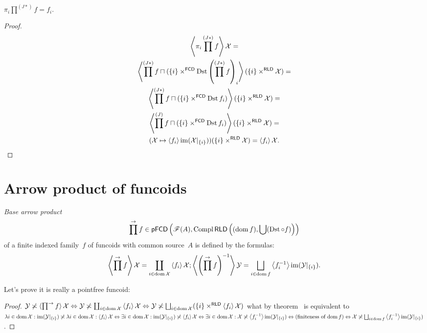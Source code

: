\begin{thm}
$\pi_i\prod^{(J\ast)}f=f_i$.
\end{thm}

\begin{proof}
\begin{multline*}
\left\langle \pi_i\prod^{(J\ast)}f\right\rangle\mathcal{X} =\\
\left\langle \prod^{(J\ast)}f\sqcap(\{i\}\times^{\mathsf{FCD}}\operatorname{Dst} \left(\prod^{(J\ast)}f\right)_i\right\rangle(\{i\}\times^{\mathsf{RLD}}\mathcal{X})=\\
\left\langle \prod^{(J\ast)}f\sqcap(\{i\}\times^{\mathsf{FCD}}\operatorname{Dst} f_i)\right\rangle(\{i\}\times^{\mathsf{RLD}}\mathcal{X})=\\
\left\langle \prod^{(J)}f\sqcap(\{i\}\times^{\mathsf{FCD}}\operatorname{Dst} f_i)\right\rangle(\{i\}\times^{\mathsf{RLD}}\mathcal{X})=\\
(\mathcal{X}\mapsto\left\langle f_i\right\rangle\operatorname{im}(\mathcal{X}|_{\{i\}}))(\{i\}\times^{\mathsf{RLD}}\mathcal{X})=
\left\langle f_i\right\rangle\mathcal{X}.
\end{multline*}
\end{proof}

\section{Arrow product of funcoids}

\begin{defn}
\emph{Base arrow product} \[ \prod^{\rightarrow}f\in\mathsf{pFCD}\left(\mathscr{F}(A),\operatorname{Compl}\mathsf{RLD}\left((\operatorname{dom} f),\bigcup(\operatorname{Dst}\circ f)\right)\right) \] of a finite indexed family~$f$ of funcoids with common source~$A$ is defined by the formulas:
\[
\supfun{\prod^{\rightarrow} f}\mathcal{X} = \coprod_{i\in\dom\mathcal{X}}\supfun{f_i}\mathcal{X};
\supfun{\left(\prod^{\rightarrow} f\right)^{-1}}\mathcal{Y} = \bigsqcup_{i\in\dom f}\supfun{f_i^{-1}}\im(\mathcal{Y}|_{\{i\}}).
\]
\end{defn}

Let's prove it is really a pointfree funcoid:

\begin{proof}
$\mathcal{Y}\nasymp\supfun{\prod^{\rightarrow} f}\mathcal{X}
\Leftrightarrow
\mathcal{Y}\nasymp\coprod_{i\in\dom\mathcal{X}}\supfun{f_i}\mathcal{X}
\Leftrightarrow
\mathcal{Y}\nasymp\bigsqcup_{i\in\dom\mathcal{X}}(\{i\}\times^{\mathsf{RLD}}\supfun{f_i}\mathcal{X})$
what by theorem~ is equivalent to
$\lambda i\in\dom\mathcal{X}:\im(\mathcal{Y}|_{\{i\}})\nasymp
\lambda i\in\dom\mathcal{X}:\supfun{f_i}\mathcal{X}
\Leftrightarrow
\exists i\in\dom\mathcal{X}:\im(\mathcal{Y}|_{\{i\}})\nasymp
\supfun{f_i}\mathcal{X}
\Leftrightarrow
\exists i\in\dom\mathcal{X}:\mathcal{X}\nasymp\supfun{f_i^{-1}}\im(\mathcal{Y}|_{\{i\}})
\Leftrightarrow\text{(finiteness of $\dom f$)}\Leftrightarrow
\mathcal{X}\nasymp\bigsqcup_{i\in\dom f}\supfun{f_i^{-1}}\im(\mathcal{Y}|_{\{i\}})$.
\end{proof}

